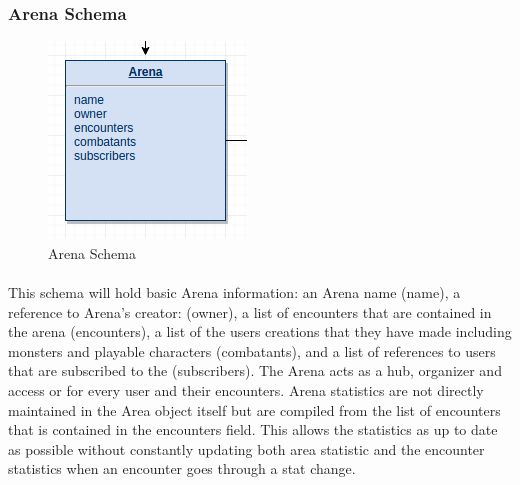 \documentclass[12pt,a4paper]{report}
\begin{document}
\subsubsection{Arena Schema}

\begin{figure}[H]
	\centering
	\includegraphics[scale=.75]{schema-arena}
	\caption{Arena Schema}
	\label{fig: Arena Schema }
\end{figure}

\paragraph{}This schema will hold basic Arena information: an Arena name (name), a reference to Arena's creator: (owner), a list of encounters that are contained in the arena (encounters), a list of the users creations that they have made including monsters and playable characters (combatants), and a list of references to users that are subscribed to the (subscribers). The Arena acts as a hub, organizer and access or for every user and their encounters. Arena statistics are not directly maintained in the Area object itself but are compiled from the list of encounters that is contained in the encounters field. This allows the statistics as up to date as possible without constantly updating both area statistic and the encounter statistics when an encounter goes through a stat change.
\end{document}
